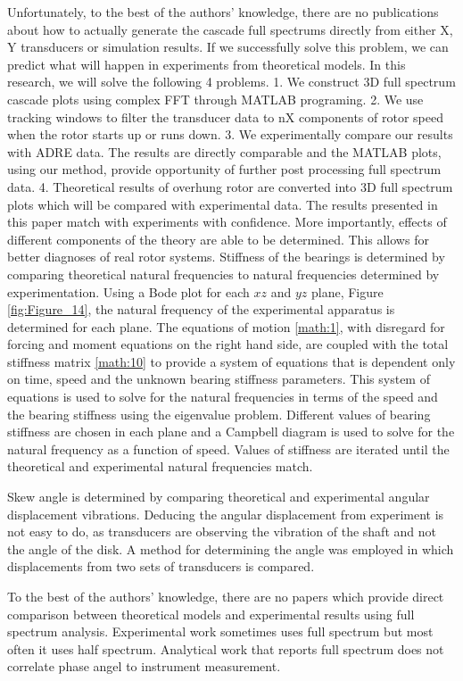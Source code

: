 		\par 
		Unfortunately, to the best of the authors’ knowledge, there are no publications about how to actually generate the cascade full spectrums directly from either X, Y transducers or simulation results. If we successfully solve this problem, we can predict what will happen in experiments from theoretical models. In this research, we will solve the following 4 problems. 1. We construct 3D full spectrum cascade plots using complex FFT through MATLAB programing. 2. We use tracking windows to filter the transducer data to nX components of rotor speed when the rotor starts up or runs down. 3. We experimentally compare our results with ADRE data. The results are directly comparable and the MATLAB plots, using our method, provide opportunity of further post processing full spectrum data. 4. Theoretical results of overhung rotor are converted into 3D full spectrum plots which will be compared with experimental data. The results presented in this paper match with experiments with confidence. More importantly, effects of different components of the theory are able to be determined. This allows for better diagnoses of real rotor systems. Stiffness of the bearings is determined by comparing theoretical natural frequencies to natural frequencies determined by experimentation. Using a Bode plot for each $xz$ and $yz$ plane, Figure \ref{fig:Figure_14}, the natural frequency of the experimental apparatus is determined for each plane. The equations of motion \ref{math:1}, with disregard for forcing and moment equations on the right hand side, are coupled with the total stiffness matrix \ref{math:10} to provide a system of equations that is dependent only on time, speed and the unknown bearing stiffness parameters. This system of equations is used to solve for the natural frequencies in terms of the speed and the bearing stiffness using the eigenvalue problem. Different values of bearing stiffness are chosen in each plane and a Campbell diagram is used to solve for the natural frequency as a function of speed. Values of stiffness are iterated until the theoretical and experimental natural frequencies match.\par
		Skew angle is determined by comparing theoretical and experimental angular displacement vibrations. Deducing the angular displacement from experiment is not easy to do, as transducers are observing the vibration of the shaft and not the angle of the disk. A method for determining the angle was employed in which displacements from two sets of transducers is compared. \par
		To the best of the authors’ knowledge, there are no papers which provide direct comparison between theoretical models and experimental results using full spectrum analysis. Experimental work sometimes uses full spectrum but most often it uses half spectrum. Analytical work that reports full spectrum does not correlate phase angel to instrument measurement.
		\par

